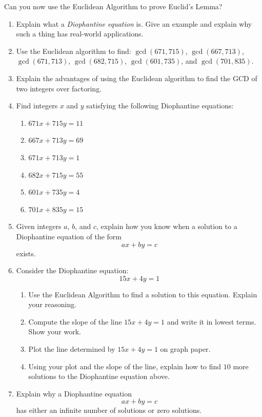 \begin{question} Can you now use the Euclidean Algorithm to prove Euclid's Lemma?
\end{question}
\QM


\newpage
\begin{problems}
\begin{enumerate}
\item Explain what a \textit{Diophantine equation} is. Give an example
  and explain why such a thing has real-world applications.
\item Use the Euclidean algorithm to find: $\gcd(671,715)$,
  $\gcd(667,713)$, $\gcd(671,713)$, $\gcd(682,715)$, $\gcd(601,735)$,
  and $\gcd(701,835)$.
\item Explain the advantages of using the Euclidean algorithm to find
  the GCD of two integers over factoring.
\item Find integers $x$ and $y$ satisfying the following Diophantine
  equations:
\begin{enumerate}
\item $671x + 715 y = 11$ 
\item $667x + 713 y = 69$ 
\item $671x + 713 y = 1$
\item $682x + 715 y = 55$
\item $601x + 735 y = 4$
\item $701x + 835 y = 15$
\end{enumerate}
\item Given integers $a$, $b$, and $c$, explain how you know when a
  solution to a Diophantine equation of the form
\[
ax + by = c
\]
exists.
\item Consider the Diophantine equation:
\[
15x + 4y = 1
\]
\begin{enumerate}
\item Use the Euclidean Algorithm to find a solution to this
  equation. Explain your reasoning.
\item Compute the slope of the line $15x + 4y = 1$ and write it in
  lowest terms. Show your work.
\item Plot the line determined by $15x + 4y = 1$ on graph paper.
\item Using your plot and the slope of the line, explain how to find
  $10$ more solutions to the Diophantine equation above.
\end{enumerate}
\item Explain why a Diophantine equation 
\[
ax + by = c
\]
has either an infinite number of solutions or zero solutions.
\end{enumerate}
\end{problems}




